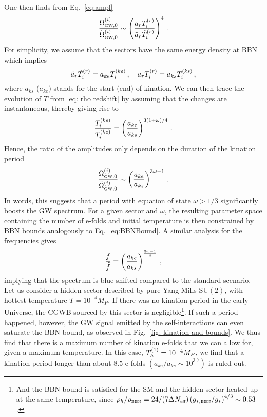 \documentclass[a4paper,11pt]{article}
\newcommand{\tem}[2]{T_{\tiny{#1}}^{(#2)}}
\newcommand{\lr}[1]{\left(#1\right)}
\newcommand{\tti}[1]{\text{\tiny{#1}}}
\begin{document}
One then finds from Eq.~\eqref{eq:ampl}
\begin{equation}
    \frac{ \Omega_{\tti{GW},0}^{(i)}}{ \tilde{\Omega}_{\tti{GW},0}^{(i)}} \sim \lr{\frac{a_r \tem{i}{r}} {\tilde{a}_{r}\tilde{T}_i^{(r)}}}^4 \,.
\end{equation}
For simplicity,
we assume that the sectors have the same energy density at BBN which implies
\begin{equation}
    \tilde{a}_r \tilde{T}_i^{(r)}=a_{ke}\tem{i}{ke} \, ,\quad a_r T_i^{(r)} = a_{ks} \tem{i}{ks}  \, ,
\end{equation}
where $a_{ks}$ ($a_{ke}$) stands for the start (end) of kination.
We can then
trace the evolution of $T$ from \eqref{eq: rho redshift} by assuming that the changes are instantaneous, thereby giving rise to
\begin{equation}
    \frac{\tem{i}{ks}}{\tem{i}{ke}}=\lr{\frac{a_{ke}}{a_{ks}}}^{3(1+\omega)/4}\, .
\end{equation}
Hence, the ratio of the amplitudes only depends on the duration of the kination period
\begin{equation}\label{eq: omega kination}
    \frac{ \Omega_{\tti{GW},0}^{(i)}}{ \tilde{\Omega}_{\tti{GW},0}^{(i)}} \sim \lr{\frac{a_{ke}}{a_{ks}}}^{3\omega-1}\, .
\end{equation}
In words, this suggests that a period with equation of state $\omega>1/3$ significantly boosts the GW spectrum.
For a given sector and $\omega$, the resulting parameter space containing the number of e-folds and initial temperature is then constrained by BBN bounds analogously to Eq.~\eqref{eq:BBNBound}.
A similar analysis for the frequencies gives 
\begin{equation}
    \dfrac{f}{\Tilde{f}}=\lr{\frac{a_{ke}}{a_{ks}}}^{\frac{3\omega-1}{4}} \,,
\end{equation}
implying that the spectrum is blue-shifted compared to the standard scenario.\\

Let us consider a hidden sector described by pure Yang-Mills $\text{SU}(2)$, with hottest temperature $T=10^{-4}M_P$.
If there was no kination period in the early Universe, the CGWB sourced by this sector is negligible\footnote{And the BBN bound is satisfied for the SM and the hidden sector heated up at the same temperature, since $\rho_h/\rho_{\tti{BBN}}=24/(7\Delta N_{\tti{eff}})\lr{g_{*,\tti{BBN}}/g_*}^{4/3}\sim0.53$.}. 
If such a period happened, however, the GW signal emitted by the self-interactions can even saturate the BBN bound, as observed in Fig.~\ref{fig: kination and bounds}.
We thus find that there is a maximum number of kination e-folds that we can allow for, given a maximum temperature. 
In this case, $\tem{h}{1}=10^{-4}M_{P}$, we find that a kination period longer than about $8.5$ e-folds $\lr{a_{ke}/a_{ks}\sim 10^{3.7}}$ is ruled out. 
\end{document}
